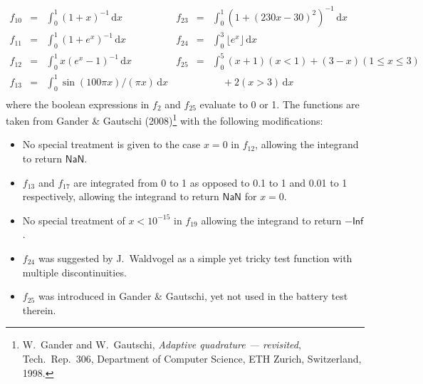 \documentclass[]{article}
\begin{document}
\begin{equation*}
\begin{array}{rclrcl}
    f_{10} & = & \textstyle \int_0^1 (1+x)^{-1} \,\mbox{d}x &
    
        f_{23} & = & \textstyle \int_0^1 (1+(230x-30)^2)^{-1} \,\mbox{d}x \\
        
    f_{11} & = & \textstyle \int_0^1 (1+e^x)^{-1} \,\mbox{d}x & 
    
        f_{24} & = & \textstyle \int_0^3 \lfloor e^x \rfloor \,\mbox{d}x \\
        
    f_{12} & = & \textstyle \int_0^1 x(e^x-1)^{-1} \,\mbox{d}x &
    
        f_{25} & = & \textstyle \int_0^5 (x+1)(x<1) + (3-x)(1 \leq x \leq3) \\
        
    f_{13} & = & \textstyle \int_{0}^1 \sin(100\pi x) / (\pi x) \,\mbox{d}x &
        & &  \quad + 2(x>3) \,\mbox{d}x \\
        
\end{array}\end{equation*}
%
where the boolean expressions
in $f_2$ and $f_{25}$ evaluate to 0 or 1.
The functions are taken from Gander \& Gautschi (2008)\footnote{W.~Gander and W.~Gautschi, {\em Adaptive quadrature --- revisited}, Tech.~Rep.~306, Department of Computer
Science, ETH Zurich, Switzerland, 1998.} with the following
modifications:
%
\begin{itemize}
    \item No special treatment is given to the case $x=0$ in
        $f_{12}$, allowing the integrand to return $\mathsf{NaN}$.
    \item $f_{13}$ and $f_{17}$ are integrated from 0 to 1 as
        opposed to 0.1 to 1 and 0.01 to 1 respectively, allowing
        the integrand to return $\mathsf{NaN}$ for $x=0$.
    \item No special treatment of $x<10^{-15}$ in $f_{19}$ allowing
        the integrand to return $-\mathsf{Inf}$.
    \item $f_{24}$ was suggested by J.\ Waldvogel as a simple yet tricky test
        function with multiple discontinuities.
    \item $f_{25}$ was introduced in Gander \& Gautschi, yet
        not used in the battery test therein.
\end{itemize}
\end{document}
